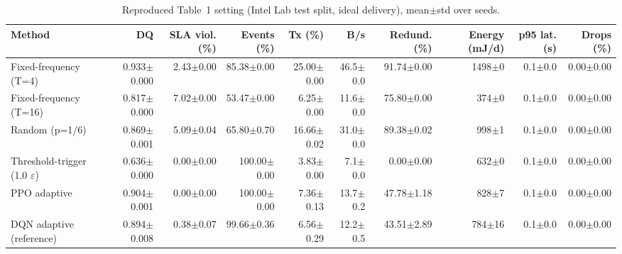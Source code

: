 \begin{table}[t]
\centering
\caption{Reproduced Table~1 setting (Intel Lab test split, ideal delivery), mean$\pm$std over seeds.}
\label{tab:repro}
\footnotesize
\begin{tabular}{lrrrrrrrrr}
\toprule
Method & DQ & SLA viol. (\%) & Events (\%) & Tx (\%) & B/s & Redund. (\%) & Energy (mJ/d) & p95 lat. (s) & Drops (\%) \\
\midrule
Fixed-frequency (T=4) & 0.933$\pm$0.000 & 2.43$\pm$0.00 & 85.38$\pm$0.00 & 25.00$\pm$0.00 & 46.5$\pm$0.0 & 91.74$\pm$0.00 & 1498$\pm$0 & 0.1$\pm$0.0 & 0.00$\pm$0.00 \\
Fixed-frequency (T=16) & 0.817$\pm$0.000 & 7.02$\pm$0.00 & 53.47$\pm$0.00 & 6.25$\pm$0.00 & 11.6$\pm$0.0 & 75.80$\pm$0.00 & 374$\pm$0 & 0.1$\pm$0.0 & 0.00$\pm$0.00 \\
Random (p=1/6) & 0.869$\pm$0.001 & 5.09$\pm$0.04 & 65.80$\pm$0.70 & 16.66$\pm$0.02 & 31.0$\pm$0.0 & 89.38$\pm$0.02 & 998$\pm$1 & 0.1$\pm$0.0 & 0.00$\pm$0.00 \\
Threshold-trigger (1.0 $\varepsilon$) & 0.636$\pm$0.000 & 0.00$\pm$0.00 & 100.00$\pm$0.00 & 3.83$\pm$0.00 & 7.1$\pm$0.0 & 0.00$\pm$0.00 & 632$\pm$0 & 0.1$\pm$0.0 & 0.00$\pm$0.00 \\
PPO adaptive & 0.904$\pm$0.001 & 0.00$\pm$0.00 & 100.00$\pm$0.00 & 7.36$\pm$0.13 & 13.7$\pm$0.2 & 47.78$\pm$1.18 & 828$\pm$7 & 0.1$\pm$0.0 & 0.00$\pm$0.00 \\
DQN adaptive (reference) & 0.894$\pm$0.008 & 0.38$\pm$0.07 & 99.66$\pm$0.36 & 6.56$\pm$0.29 & 12.2$\pm$0.5 & 43.51$\pm$2.89 & 784$\pm$16 & 0.1$\pm$0.0 & 0.00$\pm$0.00 \\
\bottomrule
\end{tabular}
\end{table}
